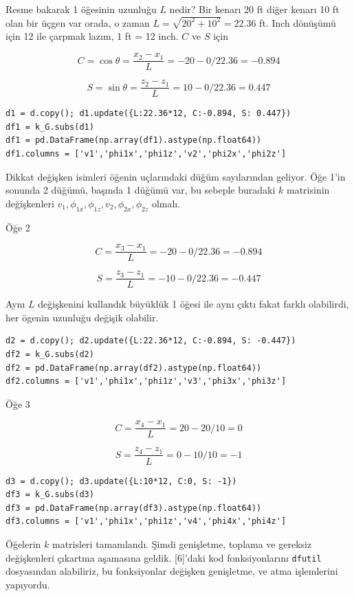 \documentclass[12pt,fleqn]{article}\usepackage{../../common}
\begin{document}
Resme bakarak 1 öğesinin uzunluğu $L$ nedir? Bir kenarı 20 ft diğer kenarı 10 ft
olan bir üçgen var orada, o zaman $L = \sqrt{ 20^2 + 10^2} = 22.36$ ft. Inch
dönüşümü için 12 ile çarpmak lazım, 1 ft = 12 inch. $C$ ve $S$ için

$$
C = \cos\theta = \frac{x_2-x_1}{L} = -20-0 / 22.36 = -0.894
$$

$$
S = \sin\theta = \frac{z_2-z_1}{L} = 10-0 / 22.36 = 0.447
$$

\begin{verbatim}
d1 = d.copy(); d1.update({L:22.36*12, C:-0.894, S: 0.447})
df1 = k_G.subs(d1)
df1 = pd.DataFrame(np.array(df1).astype(np.float64))
df1.columns = ['v1','phi1x','phi1z','v2','phi2x','phi2z']
\end{verbatim}

Dikkat değişken isimleri öğenin uçlarındaki düğüm sayılarından geliyor. Öğe 1'in
sonunda 2 düğümü, başında 1 düğümü var, bu sebeple buradaki $k$ matrisinin
değişkenleri $v_1,\phi_{1x},\phi_{1z},v_2,\phi_{2x},\phi_{2z}$ olmalı.

Öğe 2

$$
C = \frac{x_3-x_1}{L} = -20-0 / 22.36 = -0.894
$$

$$
S = \frac{z_3-z_1}{L} = -10-0 / 22.36 = -0.447
$$

Aynı $L$ değişkenini kullandık büyüklük 1 öğesi ile aynı çıktı fakat farklı
olabilirdi, her ögenin uzunluğu değişik olabilir.

\begin{verbatim}
d2 = d.copy(); d2.update({L:22.36*12, C:-0.894, S: -0.447})
df2 = k_G.subs(d2)
df2 = pd.DataFrame(np.array(df2).astype(np.float64))
df2.columns = ['v1','phi1x','phi1z','v3','phi3x','phi3z']
\end{verbatim}

Öğe 3

$$
C = \frac{x_4-x_1}{L} = 20-20 / 10 = 0
$$

$$
S = \frac{z_4-z_1}{L} = 0-10 / 10 = -1
$$

\begin{verbatim}
d3 = d.copy(); d3.update({L:10*12, C:0, S: -1})
df3 = k_G.subs(d3)
df3 = pd.DataFrame(np.array(df3).astype(np.float64))
df3.columns = ['v1','phi1x','phi1z','v4','phi4x','phi4z']
\end{verbatim}

Öğelerin $k$ matrisleri tamamlandı. Şimdi genişletme, toplama ve gereksiz
değişkenleri çıkartma aşamasına geldik. [6]'daki kod fonksiyonlarını
\verb!dfutil! dosyasından alabiliriz, bu fonksiyonlar değişken genişletme, ve
atma işlemlerini yapıyordu.
\end{document}
